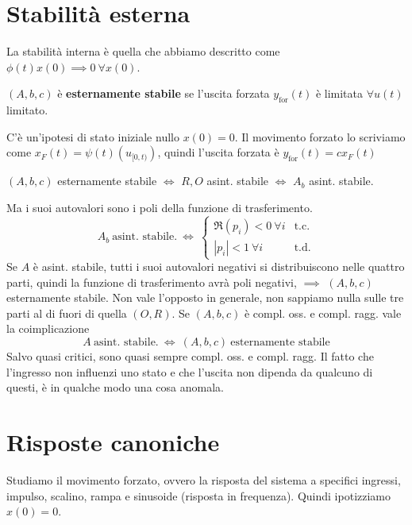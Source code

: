 \chapter{Stabilità esterna}

La stabilità interna è quella che abbiamo descritto come $\phi (t) x(0)\implies 0\ \forall x(0)$.
\begin{defn}
	$(A,b,c)$ è \textbf{esternamente stabile} se l'uscita forzata $y_{\text{for}}(t)$ è limitata $\forall u(t)$ limitato.
\end{defn}
C'è un'ipotesi di stato iniziale nullo $x(0) =0$. Il movimento forzato lo scriviamo come $x_F(t) =\psi (t)\left( u_{[ 0,t)}\right)$, quindi l'uscita forzata è $y_{\text{for}}(t) =cx_F(t)$
\begin{thm}
	$(A,b,c)$ esternamente stabile $\iff $ $R,O$ asint. stabile $\iff $ $A_b$ asint. stabile.
\end{thm}
Ma i suoi autovalori sono i poli della funzione di trasferimento.
\begin{equation*}
	A_b \ \text{asint. stabile.} \ \iff \ \begin{cases}
	\Re(p_i) < 0\ \forall i & \text{t.c.}\\
	| p_i| < 1\ \forall i & \text{t.d.}
	\end{cases}
\end{equation*}
Se $A$ è asint. stabile, tutti i suoi autovalori negativi si distribuiscono nelle quattro parti, quindi la funzione di trasferimento avrà poli negativi, $\implies $ $(A,b,c)$ esternamente stabile. Non vale l'opposto in generale, non sappiamo nulla sulle tre parti al di fuori di quella $(O,R)$. Se $(A,b,c)$ è compl. oss. e compl. ragg. vale la coimplicazione
\begin{equation*}
	A\ \text{asint. stabile.} \ \iff \ (A,b,c) \ \text{esternamente stabile}
\end{equation*}
Salvo quasi critici, sono quasi sempre compl. oss. e compl. ragg. Il fatto che l'ingresso non influenzi uno stato e che l'uscita non dipenda da qualcuno di questi, è in qualche modo una cosa anomala.

\chapter{Risposte canoniche}

Studiamo il movimento forzato, ovvero la risposta del sistema a specifici ingressi, impulso, scalino, rampa e sinusoide (risposta in frequenza). Quindi ipotizziamo $x(0) =0$.

